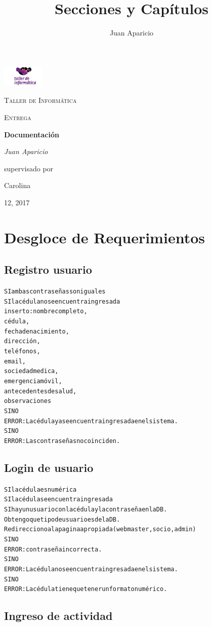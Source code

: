 \documentclass[a4paper, 12pt, spanish]{article}
\title{Secciones y Capítulos}
\author{Juan Aparicio}
\begin{document}
\begin{titlepage}
	\centering
	\includegraphics[width=0.15\textwidth]{imagenes/logo.png}\par\vspace{1cm}
	{\scshape\LARGE Taller de Informática\par}
	\vspace{1cm}
	{\scshape\Large Entrega\par}
	\vspace{1.5cm}
	{\huge\bfseries Documentación\par}
	\vspace{2cm}
	{\Large\itshape Juan Aparicio\par}
	\vfill
	supervisado por \par
	Carolina 		
	\vfill
	{\large 12, 2017\par}
\end{titlepage}

\tableofcontents
\newpage


\section{Desgloce de Requerimientos}
\subsection{Registro usuario}
\begin{alltt}
SI ambas contraseñas son iguales
    SI la cédula no se encuentra ingresada
        inserto: nombre completo,
                 cédula,
                 fecha de nacimiento,
                 dirección,
                 teléfonos,
                 email,
                 sociedad medica,
                 emergencia móvil,
                 antecedentes de salud,
                 observaciones
    SINO
        ERROR: La cédula ya se encuentra ingresada en el sistema.
SINO
    ERROR: Las contraseñas no coinciden.
\end{alltt}

\subsection{Login de usuario}
\begin{alltt}
SI la cédula es numérica
    SI la cédula se encuentra ingresada
        SI hay un usuario con la cédula y la contraseña en la DB.
            Obtengo que tipo de usuario es de la DB.
            Redirecciono a la pagina apropiada (webmaster, socio, admin)
        SINO
            ERROR: contraseña incorrecta.
    SINO
    	ERROR: La cédula no se encuentra ingresada en el sistema.
SINO
	ERROR: La cédula tiene que tener un formato numérico.
\end{alltt}

\subsection{Ingreso de actividad}
\end{document}
